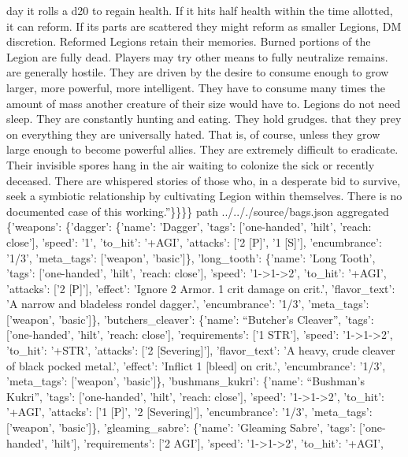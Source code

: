 \documentclass[
  letterpaper,
  DIV=11,
  numbers=noendperiod]{scrartcl}
\begin{document}
{day it rolls a d20 to regain health. If it hits half health within the
time allotted, it can reform. If its parts are scattered they might
reform as smaller Legions, DM discretion. Reformed Legions retain their
memories. Burned portions of the Legion are fully dead. Players may try
other means to fully neutralize remains. \n\nLegions are generally
hostile. They are driven by the desire to consume enough to grow larger,
more powerful, more intelligent. They have to consume many times the
amount of mass another creature of their size would have to. Legions do
not need sleep. They are constantly hunting and eating. They hold
grudges. \n\nGiven that they prey on everything they are universally
hated. That is, of course, unless they grow large enough to become
powerful allies. They are extremely difficult to eradicate. Their
invisible spores hang in the air waiting to colonize the sick or
recently deceased. There are whispered stories of those who, in a
desperate bid to survive, seek a symbiotic relationship by cultivating
Legion within themselves. There is no documented case of this
working.''\}\}\}\} path ../.././source/bags.json aggregated \{'weapons':
\{'dagger': \{'name': 'Dagger', 'tags': {[}'one-handed', 'hilt', 'reach:
close'{]}, 'speed': '1', 'to\_hit': '+AGI', 'attacks': {[}'2 {[}P{]}',
'1 {[}S{]}'{]}, 'encumbrance': '1/3', 'meta\_tags': {[}'weapon',
'basic'{]}\}, 'long\_tooth': \{'name': 'Long Tooth', 'tags':
{[}'one-handed', 'hilt', 'reach: close'{]}, 'speed':
'1-\textgreater1-\textgreater2', 'to\_hit': '+AGI', 'attacks': {[}'2
{[}P{]}'{]}, 'effect': 'Ignore 2 Armor. 1 crit damage on crit.',
'flavor\_text': 'A narrow and bladeless rondel dagger.', 'encumbrance':
'1/3', 'meta\_tags': {[}'weapon', 'basic'{]}\}, 'butchers\_cleaver':
\{'name': ``Butcher's Cleaver'', 'tags': {[}'one-handed', 'hilt',
'reach: close'{]}, 'requirements': {[}'1 STR'{]}, 'speed':
'1-\textgreater1-\textgreater2', 'to\_hit': '+STR', 'attacks': {[}'2
{[}Severing{]}'{]}, 'flavor\_text': 'A heavy, crude cleaver of black
pocked metal.', 'effect': 'Inflict 1 {[}bleed{]} on crit.',
'encumbrance': '1/3', 'meta\_tags': {[}'weapon', 'basic'{]}\},
'bushmans\_kukri': \{'name': ``Bushman's Kukri'', 'tags':
{[}'one-handed', 'hilt', 'reach: close'{]}, 'speed':
'1-\textgreater1-\textgreater2', 'to\_hit': '+AGI', 'attacks': {[}'1
{[}P{]}', '2 {[}Severing{]}'{]}, 'encumbrance': '1/3', 'meta\_tags':
{[}'weapon', 'basic'{]}\}, 'gleaming\_sabre': \{'name': 'Gleaming
Sabre', 'tags': {[}'one-handed', 'hilt'{]}, 'requirements': {[}'2
AGI'{]}, 'speed': '1-\textgreater1-\textgreater2', 'to\_hit': '+AGI',
}
\end{document}
